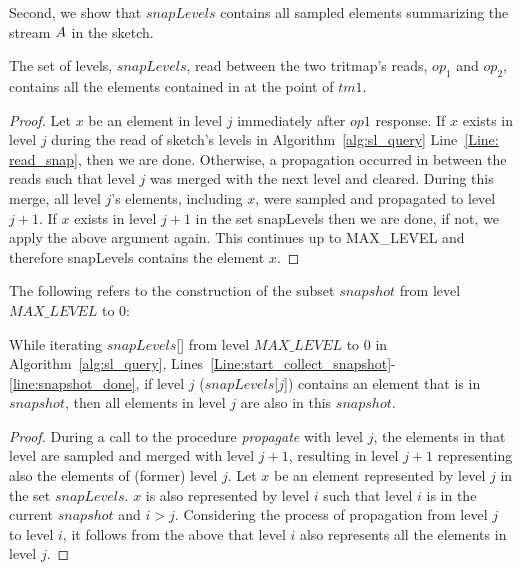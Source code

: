 Second, we show that $snapLevels$ contains all sampled elements summarizing the stream $\mathnormal{A}$ in the sketch.


\begin{lemma}\label{Lem: snap_no_miss}
The set of levels, $snapLevels$, read between the two tritmap's reads, $op_1$ and $op_2$, contains all the elements contained in \mysketch at the point of $tm1$. 
\end{lemma}
\begin{proof}
Let $x$ be an element in level $j$ immediately after $op1$ response.
If $x$ exists in level $j$ during the read of sketch's levels in Algorithm~\ref{alg:sl_query} Line~\ref{Line: read_snap}, then we are done.
Otherwise, a propagation occurred in between the reads such that level $j$ was merged with the next level and cleared. During this merge, all level $j$'s elements, including $x$, were sampled and propagated to level $j+1$. If $x$ exists in level $j+1$ in the set 
snapLevels then we are done, if not, we apply the above argument again. This continues up to MAX\_LEVEL and therefore snapLevels contains the element $x$.
\end{proof}

The following refers to the construction of the subset $snapshot$ from level $\mathit{MAX\_LEVEL}$ to $0$:

\begin{lemma} \label{Lem: all_dup}
While iterating $\mathit{snapLevels}$[] from level $\mathit{MAX\_LEVEL}$ to $0$ in Algorithm~\ref{alg:sl_query}, Lines~\ref{Line:start_collect_snapshot}-\ref{line:snapshot_done}, if level $j$ ($\mathit{snapLevels}$[$j$]) contains an element that is in $snapshot$, then all elements in level $j$ are also in this $snapshot$.
\end{lemma}
\begin{proof}
During a call to the procedure \emph{propagate} with level $j$, the elements in that level are sampled and merged with level $j+1$, resulting in level $j+1$ representing also the elements of (former) level $j$.
Let $x$ be an element represented by level $j$ in the set $snapLevels$.
$x$ is also represented by level $i$ such that level $i$ is in the current $snapshot$ and $i>j$. Considering the process of propagation from level $j$ to level $i$, it follows from the above that level $i$ also represents all the elements in level $j$.
\end{proof}

